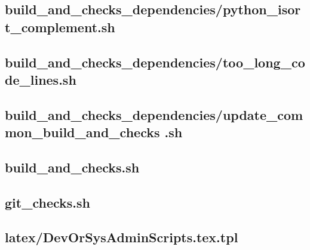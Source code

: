 \documentclass{article}
\begin{document}


\subsection{
  build\_and\_checks\_dependencies/python\_isort\_complement.sh
}
\label{
  build_and_checks_dependencies:python_isort_complementsh
}



\subsection{
  build\_and\_checks\_dependencies/too\_long\_code\_lines.sh
}
\label{
  build_and_checks_dependencies:too_long_code_linessh
}



\subsection{
  build\_and\_checks\_dependencies/update\_common\_build\_and\_checks%
.sh
}
\label{
  build_and_checks_dependencies:update_common_build_and_checkssh
}



\subsection{
  build\_and\_checks.sh
}
\label{
  build_and_checkssh
}



\subsection{
  git\_checks.sh
}
\label{
  git_checkssh
}



\subsection{
  latex/DevOrSysAdminScripts.tex.tpl
}
\label{
  latex:DevOrSysAdminScriptstextpl
}
\end{document}
